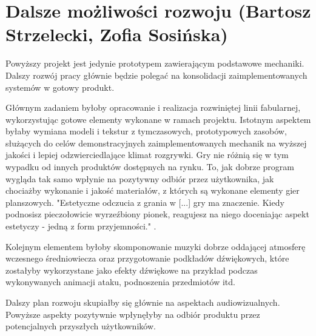 \section{Dalsze możliwości rozwoju (Bartosz Strzelecki, Zofia Sosińska)}\label{s:dalsze}
Powyższy projekt jest jedynie prototypem zawierającym podstawowe mechaniki.
Dalszy rozwój pracy głównie będzie polegać na konsolidacji zaimplementowanych
systemów w gotowy produkt.

Głównym zadaniem byłoby opracowanie i realizacja rozwiniętej linii fabularnej,
wykorzystując gotowe elementy wykonane w ramach projektu. Istotnym aspektem
byłaby wymiana modeli i tekstur z tymczasowych, prototypowych zasobów, służących
do celów demonstracyjnych zaimplementowanych mechanik na wyższej jakości
i lepiej odzwierciedlające klimat rozgrywki. Gry nie różnią się w tym wypadku od
innych produktów dostępnych na rynku. To, jak dobrze program wygląda tak samo wpłynie na
pozytywny odbiór przez użytkownika, jak chociażby wykonanie i jakość materiałów, z których są wykonane elementy
gier planszowych. "Estetyczne odczucia z grania w [...] gry ma znaczenie. Kiedy podnosisz pieczołowicie wyrzeźbiony pionek, reagujesz na niego
doceniając aspekt estetyczy - jedną z form przyjemności." \cite{theory_of_fun}.

Kolejnym elementem byłoby skomponowanie muzyki dobrze oddającej atmosferę wczesnego
średniowiecza oraz przygotowanie podkładów dźwiękowych, które zostałyby wykorzystane
jako efekty dźwiękowe na przykład podczas wykonywanych animacji ataku, podnoszenia przedmiotów itd.

Dalszy plan rozwoju skupiałby się głównie na aspektach audiowizualnych.
Powyższe aspekty pozytywnie wpłynęłyby na odbiór produktu przez potencjalnych przyszłych
użytkowników. 
